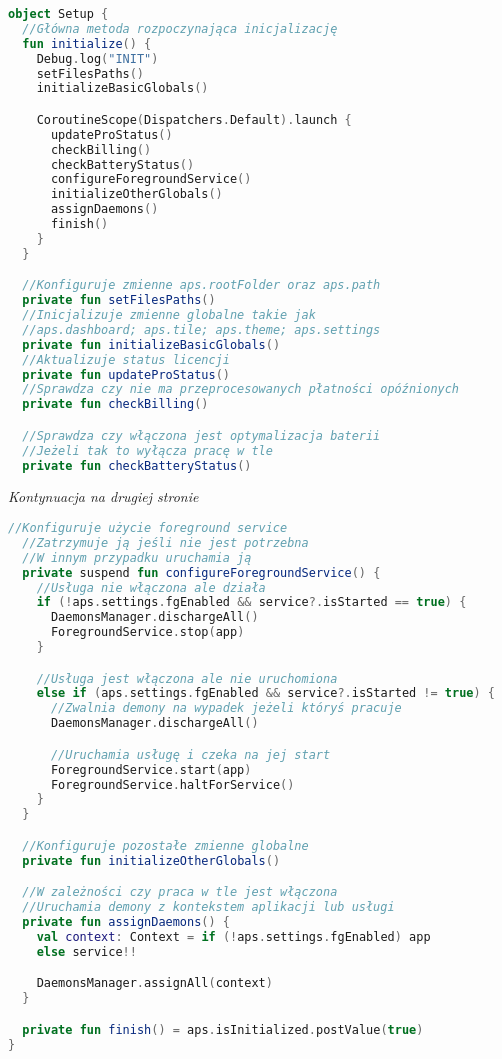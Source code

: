 \begin{lstlisting}[language=Kotlin]
object Setup {
  //Główna metoda rozpoczynająca inicjalizację
  fun initialize() {
    Debug.log("INIT")
    setFilesPaths()
    initializeBasicGlobals()

    CoroutineScope(Dispatchers.Default).launch {
      updateProStatus()
      checkBilling()
      checkBatteryStatus()
      configureForegroundService()
      initializeOtherGlobals()
      assignDaemons()
      finish()
    }
  }

  //Konfiguruje zmienne aps.rootFolder oraz aps.path
  private fun setFilesPaths()
  //Inicjalizuje zmienne globalne takie jak
  //aps.dashboard; aps.tile; aps.theme; aps.settings
  private fun initializeBasicGlobals()
  //Aktualizuje status licencji
  private fun updateProStatus()
  //Sprawdza czy nie ma przeprocesowanych płatności opóźnionych
  private fun checkBilling()

  //Sprawdza czy włączona jest optymalizacja baterii
  //Jeżeli tak to wyłącza pracę w tle
  private fun checkBatteryStatus()
\end{lstlisting}

\textit{Kontynuacja na drugiej stronie}

\newpage

\begin{lstlisting}[language=Kotlin]
  //Konfiguruje użycie foreground service
  //Zatrzymuje ją jeśli nie jest potrzebna
  //W innym przypadku uruchamia ją
  private suspend fun configureForegroundService() {
    //Usługa nie włączona ale działa
    if (!aps.settings.fgEnabled && service?.isStarted == true) {
      DaemonsManager.dischargeAll()
      ForegroundService.stop(app)
    }

    //Usługa jest włączona ale nie uruchomiona
    else if (aps.settings.fgEnabled && service?.isStarted != true) {
      //Zwalnia demony na wypadek jeżeli któryś pracuje
      DaemonsManager.dischargeAll()

      //Uruchamia usługę i czeka na jej start
      ForegroundService.start(app)
      ForegroundService.haltForService()
    }
  }

  //Konfiguruje pozostałe zmienne globalne
  private fun initializeOtherGlobals()

  //W zależności czy praca w tle jest włączona
  //Uruchamia demony z kontekstem aplikacji lub usługi
  private fun assignDaemons() {
    val context: Context = if (!aps.settings.fgEnabled) app
    else service!!

    DaemonsManager.assignAll(context)
  }

  private fun finish() = aps.isInitialized.postValue(true)
}
\end{lstlisting}


